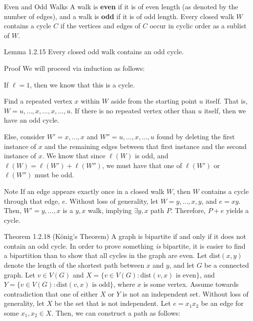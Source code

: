 \documentclass[10pt]{extarticle}
\begin{document}
\begin{problem}{Even and Odd Walks}
  A walk is \textbf{even} if it is of even length (as denoted by the number of edges), and a walk is \textbf{odd} if it is of odd length. Every closed walk $W$ contains a cycle $C$ if the vertices and edges of $C$ occur in cyclic order as a sublist of $W$.
  \begin{problem}{Lemma 1.2.15}
    Every closed odd walk contains an odd cycle.
  \end{problem}
  \begin{problem}{Proof}
    We will proceed via induction as follows:
    \begin{description}[font=\normalfont\scshape]
      \item[Base Case] If $\ell = 1$, then we know that this is a cycle.
      \item [Inductive Hypothesis] Find a repeated vertex $x$ within $W$ aside from the starting point $u$ itself. That is, $W = u,\dots,x,\dots,x,\dots,u$. If there is no repeated vertex other than $u$ itself, then we have an odd cycle.
      \item[Proof] Else, consider $W' = x,\dots,x$ and $W'' = u,\dots,x,\dots,u$ found by deleting the first instance of $x$ and the remaining edges between that first instance and the second instance of $x$. We know that since $\ell(W)$ is odd, and $\ell(W) = \ell(W') + \ell(W'')$, we must have that one of $\ell(W')$ or $\ell(W'')$ must be odd.
    \end{description}
  \end{problem}
  \begin{problem}{Note}
    If an edge appears exactly once in a closed walk $W$, then $W$ contains a cycle through that edge, $e$.
    \tcblower
    Without loss of generality, let $W = y,\dots,x,y$, and $e = xy$. Then, $W' = y,\dots,x$ is a $y,x$ walk, implying $\exists y,x$ path $P$. Therefore, $P + e$ yields a cycle.
  \end{problem}
  \begin{problem}{Theorem 1.2.18 (König's Theorem)}
    A graph is bipartite if and only if it does not contain an odd cycle.
    \tcblower
    In order to prove something \textit{is} bipartite, it is easier to find a bipartition than to show that all cycles in the graph are even.
    Let $\textrm{dist}(x,y)$ denote the length of the shortest path between $x$ and $y$, and let $G$ be a connected graph. Let $v\in V(G)$ and $X = \{v\in V(G): \textrm{dist}(v,x)\textrm{ is even} \}$, and $Y = \{v\in V(G): \textrm{dist}(v,x)\textrm{ is odd} \}$, where $x$ is some vertex. Assume towards contradiction that one of either $X$ or $Y$ is not an independent set. Without loss of generality, let $X$ be the set that is not independent. Let $e = x_1x_2$ be an edge for some $x_1,x_2\in X$. Then, we can construct a path as follows:

\end{problem}
\end{problem}
\end{document}
